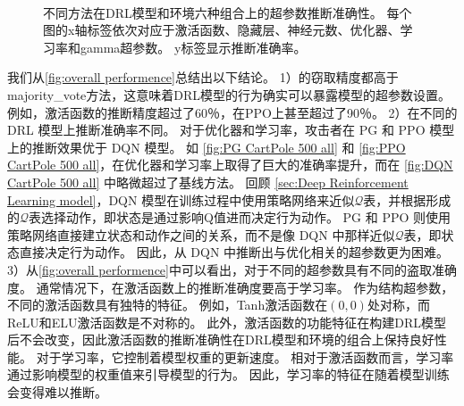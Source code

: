 \begin{figure}[!ht]
{    \label{fig:PPO Acrobot -100 all}
    }\\[-0.5ex]
    \vspace{-0.4cm}
    \caption{不同方法在DRL模型和环境六种组合上的超参数推断准确性。
    每个图的x轴标签依次对应于激活函数、隐藏层、神经元数、优化器、学习率和gamma超参数。
    y标签显示推断准确率。
    }
    \label{fig:overall performence}
\end{figure}

我们从\autoref{fig:overall performence}总结出以下结论。
1）\sysname 的窃取精度都高于majority\_vote方法，这意味着DRL模型的行为确实可以暴露模型的超参数设置。
例如，激活函数的推断精度超过了60％，在PPO上甚至超过了90％。
2）\sysname 在不同的 DRL 模型上推断准确率不同。
对于优化器和学习率，攻击者在 PG 和 PPO 模型上的推断效果优于 DQN 模型。
如 \autoref{fig:PG CartPole 500 all} 和 \autoref{fig:PPO CartPole 500 all}，\sysname 在优化器和学习率上取得了巨大的准确率提升，而在 \autoref{fig:DQN CartPole 500 all} 中略微超过了基线方法。
回顾 \autoref{sec:Deep Reinforcement Learning model}，DQN 模型在训练过程中使用策略网络来近似$\mathcal{Q}$表，并根据形成的$\mathcal{Q}$表选择动作，即状态是通过影响Q值进而决定行为动作。
PG 和 PPO 则使用策略网络直接建立状态和动作之间的关系，而不是像 DQN 中那样近似$\mathcal{Q}$表，即状态直接决定行为动作。
因此，从 DQN 中推断出与优化相关的超参数更为困难。
3）从\autoref{fig:overall performence}中可以看出，\sysname 对于不同的超参数具有不同的盗取准确度。
通常情况下，\sysname 在激活函数上的推断准确度要高于学习率。
作为结构超参数，不同的激活函数具有独特的特征。
例如，Tanh激活函数在$(0,0)$处对称，而ReLU和ELU激活函数是不对称的。
此外，激活函数的功能特征在构建DRL模型后不会改变，因此激活函数的推断准确性在DRL模型和环境的组合上保持良好性能。
对于学习率，它控制着模型权重的更新速度。
相对于激活函数而言，学习率通过影响模型的权重值来引导模型的行为。
因此，学习率的特征在随着模型训练会变得难以推断。

